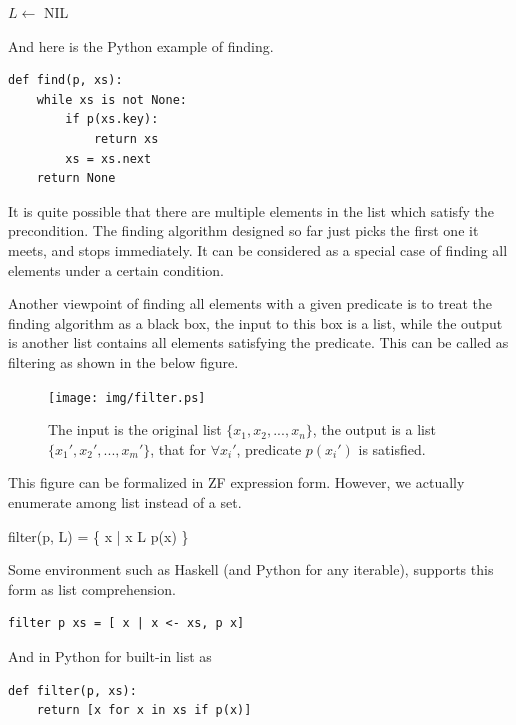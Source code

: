 \documentclass[b5paper]{article}
\begin{document}
\begin{algorithmic}[1]
      \State \Return {}
    \EndIf
    \State $L \gets$ 
  \EndWhile
  \State \Return NIL
\EndFunction
\end{algorithmic}

And here is the Python example of finding.

\lstset{language=Python}
\begin{lstlisting}
def find(p, xs):
    while xs is not None:
        if p(xs.key):
            return xs
        xs = xs.next
    return None
\end{lstlisting}

It is quite possible that there are multiple elements in the list which satisfy the precondition.
The finding algorithm designed so far just picks the first one it meets, and stops immediately.
It can be considered as a special case of finding all elements under a certain condition.

Another viewpoint of finding all elements with a given predicate is to treat the finding algorithm
as a black box, the input to this box is a list, while the output is another list contains
all elements satisfying the predicate. This can be called as filtering as shown in the below
figure.

\begin{figure}[htbp]
        \centering
        \texttt{[image: img/filter.ps]}
        \caption{The input is the original list $\{x_1, x_2, ..., x_n\}$, the output is a list $\{x_1', x_2', ..., x_m'\}$, that for $\forall x_i'$, predicate $p(x_i')$ is satisfied.} \label{fig:filter}
\end{figure}

This figure can be formalized in ZF expression form. However, we actually
enumerate among list instead of a set.

\be
filter(p, L) = \{ x | x \in L \land p(x) \}
\ee

Some environment such as Haskell (and Python for any iterable), supports this form as list comprehension.

\lstset{language=Haskell}
\begin{lstlisting}
filter p xs = [ x | x <- xs, p x]
\end{lstlisting}

And in Python for built-in list as

\lstset{language=Python}
\begin{lstlisting}
def filter(p, xs):
    return [x for x in xs if p(x)]
\end{lstlisting}
\end{document}
